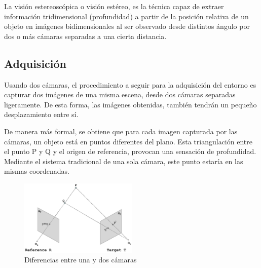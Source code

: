 

La visión estereoscópica o visión estéreo, es la técnica capaz de extraer
información tridimensional (profundidad) a partir de la posición relativa de un
objeto en imágenes bidimensionales al ser observado desde distintos ángulo por
dos o más cámaras separadas a una cierta distancia.


\subsection{Adquisición}

Usando dos cámaras, el procedimiento a seguir para la adquisición del entorno
es capturar dos imágenes de una misma escena, desde dos cámaras separadas
ligeramente. De esta forma, las imágenes obtenidas, también tendrán un pequeño 
desplazamiento entre sí.

De manera más formal, se obtiene que para cada imagen capturada por las
cámaras, un objeto está en puntos diferentes del plano. Esta triangulación
entre el punto P y Q y el origen de referencia, provocan una sensación de
profundidad. Mediante el sistema tradicional de una sola cámara, este punto
estaría en las mismas coordenadas.

\begin{figure}[!th]
  \begin{center}
    \includegraphics[width=0.5\textwidth]{images/cap2/VisionEstereo.eps}
    \caption{Diferencias entre una y dos cámaras}
    \label{fig:VisionEstereo}
  \end{center}
\end{figure}


